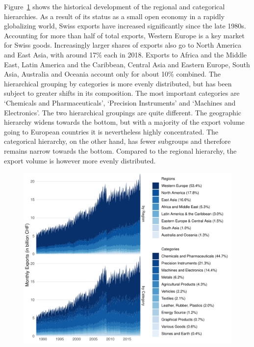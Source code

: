 \documentclass[a4paper,fleqn,11pt]{article}
\begin{document}
Figure~\ref{fig:area} shows the historical development of the regional and categorical hierarchies. As a result of its status as a small open economy in a rapidly globalizing world, Swiss exports have increased significantly since the late 1980s. Accounting for more than half of total exports, Western Europe is a key market for Swiss goods. Increasingly larger shares of exports also go to North America and East Asia, with around 17\% each in 2018. Exports to Africa and the Middle East, Latin America and the Caribbean, Central Asia and Eastern Europe, South Asia, Australia and Oceania account only for about 10\% combined. The hierarchical grouping by categories is more evenly distributed, but has been subject to greater shifts in its composition. The most important categories are `Chemicals and Pharmaceuticals', `Precision Instruments' and `Machines and Electronics'. The two hierarchical groupings are quite different. The geographic hierarchy widens towards the bottom, but with a majority of the export volume going to European countries it is nevertheless highly concentrated. The categorical hierarchy, on the other hand, has fewer subgroups and therefore remains narrow towards the bottom. Compared to the regional hierarchy, the export volume is however more evenly distributed. 

\begin{figure}[H]
	\includegraphics[width=\textwidth]{fig/fig_area}
	\label{fig:area}
\end{figure}
\end{document}
